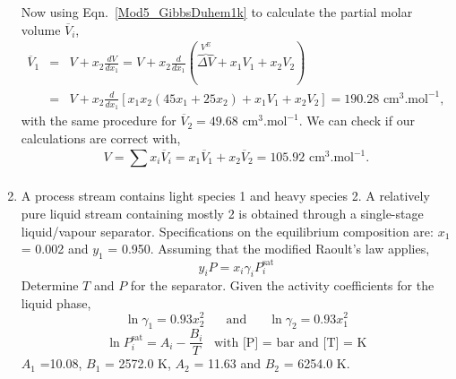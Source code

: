 \documentclass[12pts,a4paper,amsmath,amssymb,floatfix]{article}%
\newcommand{\frc}{\displaystyle\frac}
\newcommand{\summation}[3][error]{\sum\limits_{#2}^{#3}#1}
\begin{document}
\begin{enumerate}[1)]
              Now using Eqn.~\ref{Mod5_GibbsDuhem1k} to calculate the partial molar volume $\overline{V}_{i}$,
                 \begin{eqnarray}
                    \overline{V}_{1} &=& V + x_{2}\frc{dV}{dx_{1}} = V + x_{2}\frc{d}{dx_{1}} \left(\overbrace{\Delta V}^{V^{E}} + x_{1}V_{1} + x_{2}V_{2}\right) \nonumber \\
                         &=& V + x_{2}\frc{d}{dx_{1}} \left[x_{1}x_{2}\left(45x_{1}+25x_{2}\right)+x_{1}V_{1}+x_{2}V_{2}\right] = 190.28\text{ cm}^{3}.\text{mol}^{-1}, \nonumber
                 \end{eqnarray}
              with the same procedure for $\overline{V}_{2}=49.68\text{ cm}^{3}.\text{mol}^{-1}$. We can check if our calculations are correct with,
                 \begin{displaymath}
                      V = \summation[x_{i}\overline{V}_{i}]{}{} = x_{1}\overline{V}_{1} + x_{2}\overline{V}_{2} = 105.92\text{ cm}^{3}.\text{mol}^{-1}.
                 \end{displaymath}

\clearpage
            
   \item\label{Mod05Ex02}  A process stream contains light species 1 and heavy species 2. A relatively pure liquid stream containing mostly 2 is obtained through a single-stage liquid/vapour separator. Specifications on the equilibrium composition are: $x_{1}$ = 0.002 and $y_{1}$ = 0.950. Assuming that the modified Raoult's law applies, 
\begin{displaymath}
  y_{i} P = x_{i}\gamma_{i}P_{i}^{\text{sat}}
\end{displaymath} 
Determine $T$ and $P$ for the separator. Given the activity coefficients for the liquid phase,
\begin{displaymath}
\ln\gamma_{1} = 0.93x_{2}^{2} \;\;\;\;\;\text{ and }\;\;\;\;\;\ln\gamma_{2}=0.93x_{1}^{2}
\end{displaymath}
\begin{displaymath}
\ln P_{i}^{\text{sat}} = A_{i} - \frc{B_{i}}{T}\;\;\;\text{with [P] = bar and [T] = K}
\end{displaymath} 
$A_{1}$ =10.08, $B_{1}$ = 2572.0 K, $A_{2}$ = 11.63 and $B_{2}$ = 6254.0 K.


\end{enumerate}
\end{document}

